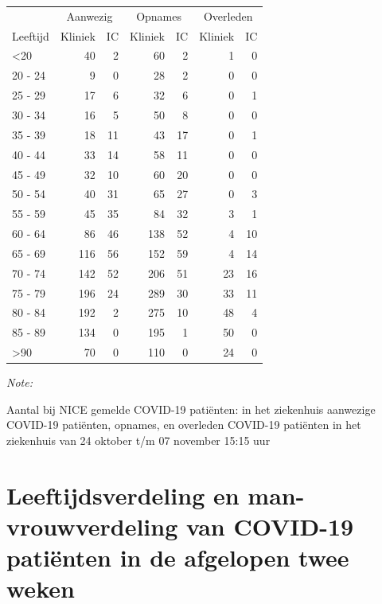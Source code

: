 \documentclass[
  english,
  man,floatsintext]{apa6}
\begin{document}
\begin{table}
\centering\begingroup\fontsize{10}{12}\selectfont

\begin{threeparttable}
\begin{tabular}{lrrrrrr}
\toprule
\multicolumn{1}{c}{ } & \multicolumn{2}{c}{Aanwezig} & \multicolumn{2}{c}{Opnames} & \multicolumn{2}{c}{Overleden} \\
\cmidrule(l{3pt}r{3pt}){2-3} \cmidrule(l{3pt}r{3pt}){4-5} \cmidrule(l{3pt}r{3pt}){6-7}
Leeftijd & Kliniek & IC & Kliniek & IC & Kliniek & IC\\
\midrule
<20 & 40 & 2 & 60 & 2 & 1 & 0\\
20 - 24 & 9 & 0 & 28 & 2 & 0 & 0\\
25 - 29 & 17 & 6 & 32 & 6 & 0 & 1\\
30 - 34 & 16 & 5 & 50 & 8 & 0 & 0\\
35 - 39 & 18 & 11 & 43 & 17 & 0 & 1\\
40 - 44 & 33 & 14 & 58 & 11 & 0 & 0\\
45 - 49 & 32 & 10 & 60 & 20 & 0 & 0\\
50 - 54 & 40 & 31 & 65 & 27 & 0 & 3\\
55 - 59 & 45 & 35 & 84 & 32 & 3 & 1\\
60 - 64 & 86 & 46 & 138 & 52 & 4 & 10\\
65 - 69 & 116 & 56 & 152 & 59 & 4 & 14\\
70 - 74 & 142 & 52 & 206 & 51 & 23 & 16\\
75 - 79 & 196 & 24 & 289 & 30 & 33 & 11\\
80 - 84 & 192 & 2 & 275 & 10 & 48 & 4\\
85 - 89 & 134 & 0 & 195 & 1 & 50 & 0\\
>90 & 70 & 0 & 110 & 0 & 24 & 0\\
\bottomrule
\end{tabular}
\begin{tablenotes}
\item \textit{Note: } 
\item Aantal bij NICE gemelde COVID-19 patiënten: in het ziekenhuis aanwezige COVID-19 patiënten, opnames, en overleden COVID-19 patiënten in het ziekenhuis van 24 oktober t/m 07 november 15:15 uur
\end{tablenotes}
\end{threeparttable}
\endgroup{}
\end{table}

\newpage

\hypertarget{leeftijdsverdeling-en-man-vrouwverdeling-van-covid-19-patiuxebnten-in-de-afgelopen-twee-weken}{%
\section{Leeftijdsverdeling en man-vrouwverdeling van COVID-19 patiënten in de afgelopen twee weken}\label{leeftijdsverdeling-en-man-vrouwverdeling-van-covid-19-patiuxebnten-in-de-afgelopen-twee-weken}}
\end{document}
